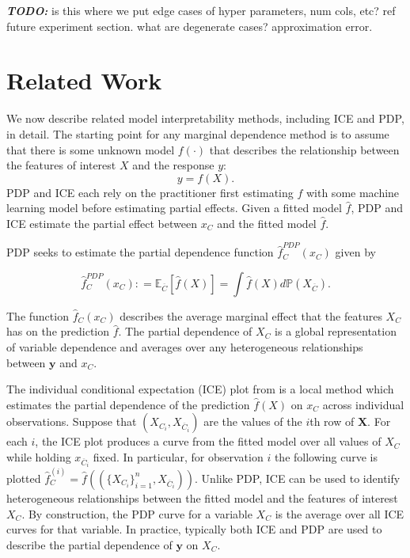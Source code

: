 \documentclass[12pt]{article}
\newcommand{\todo}[1]{{\bf\em TODO:} {{#1}}}
\begin{document}
\todo{is this where we put edge cases of hyper parameters, num cols, etc? ref future experiment section. what are degenerate cases? approximation error.}

\section{Related Work}\label{sec:related}

We now describe related model interpretability methods, including ICE and PDP, in detail. The starting point for any marginal dependence method is to assume that there is some unknown model $f(\cdot)$ that describes the relationship between the features of interest $X$ and the response $y$:
\vskip -1pc
$${y} = f({X}).$$  PDP and ICE each rely on the practitioner first estimating $f$ with some machine learning model before estimating partial effects. Given a fitted model $\widehat{f}$, PDP and ICE estimate the partial effect between $x_C$ and the fitted model $\widehat{f}$. 

PDP seeks to estimate the partial dependence function $\widehat{f}^{PDP}_C(x_C)$ given by

\begin{equation*}\label{eq:PDP} \widehat{f}^{PDP}_C(x_C): = \mathbb{E}_{\overline{C}}\left[\widehat{f}({X})\right] = \int \widehat{f}({X}) d\mathbb{P}(X_{\overline{C}}).\end{equation*}


The function $\widehat{f}_C(x_C)$ describes the average marginal effect that the features $X_C$ has on the prediction $\widehat{f}$. The partial dependence of $X_C$ is a global representation of variable dependence and averages over any heterogeneous relationships between $\mathbf{y}$ and $x_C$. 

The individual conditional expectation (ICE) plot from \cite{ICE} is a local method which estimates the partial dependence of the prediction $\widehat{f}({X})$ on $x_C$ across individual observations. Suppose that $(X_{C_i}, X_{\overline{C}_i})$ are the values of the $i$th row of $\mathbf{X}$. For each $i$, the ICE plot produces a curve from the fitted model over all values of $X_C$ while holding $x_{\overline{C}_i}$ fixed. In particular, for observation $i$ the following curve is plotted $\widehat{f}^{(i)}_C = \widehat{f}((\{X_{C_i}\}_{i = 1}^n, X_{\overline{C}_i}))$. Unlike PDP, ICE can be used to  identify heterogeneous relationships between the fitted model and the features of interest $X_C$. By construction, the PDP curve for a variable $X_C$ is the average over all ICE curves for that variable. In practice, typically both ICE and PDP are used to describe the partial dependence of $\mathbf{y}$ on $X_C$.
\end{document}
